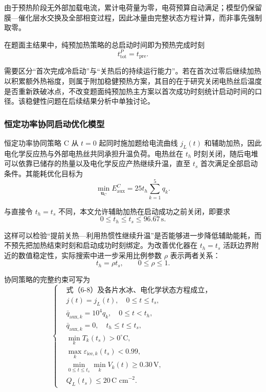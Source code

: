 \documentclass[bwprint]{gmcmthesis}
\numberwithin{figure}{section}
\begin{document}
\noindent 由于预热阶段无外部加载电流，累计电荷量为零，电荷预算自动满足；模型仍保留膜—催化层水交换及全部相变过程，因此冰量由完整状态方程计算，而非事先强制取零。

\noindent 在题面主结果中，纯预加热策略的总启动时间即为预热完成时刻
\begin{equation}
t_{\text{tot}}^P = t_{\text{pre}}. \tag{6-32}
\end{equation}

\noindent 需要区分“首次完成冷启动”与“关热后的持续运行能力”。若在首次过零后继续加热以积累额外热裕度，则属于附加稳健预热方案，其目的在于研究关闭电热丝后温度是否重新跌破冰点，不改变题面纯预加热主方案以首次成功时刻统计启动时间的口径。该稳健性问题在后续结果分析中单独讨论。

\subsubsection{恒定功率协同启动优化模型}

\noindent 恒定功率协同策略 C 从 \(t = 0\) 起同时施加题给电流曲线 \(j_L(t)\) 和辅助加热，因此电化学反应热与外部电热丝共同承担升温负荷。电热丝在 \(t_h\) 时刻关闭，随后电堆可以依靠已储存的热量以及电化学反应产热继续升温，直至 \(t_s\) 首次满足全部启动条件。其能耗优化目标为
\begin{equation}
\min_{\boldsymbol{u}_C} E_{\text{aux}}^C = 25 t_h \sum_{k=1}^5 q_k. \tag{6-33}
\end{equation}

\noindent 与直接令 \(t_h = t_s\) 不同，本文允许辅助加热在启动成功之前关闭，即要求
\begin{equation}
0 \leq t_h \leq t_s \leq 96.67 \, \text{s}. \tag{6-34}
\end{equation}

\noindent 这样可以检验“提前关热—利用热惯性继续升温”是否能够进一步降低辅助能耗，而不预先把加热结束时刻和启动成功时刻绑定。为改善优化器在 \(t_h = t_s\) 活跃边界附近的数值稳定性，实际搜索中进一步采用比例参数 \(\rho\) 表示两者关系：
\begin{equation}
t_h = \rho t_s, \qquad 0 \leq \rho \leq 1. \tag{6-35}
\end{equation}

\noindent 协同策略的完整约束可写为
\begin{equation}
\left\{
\begin{aligned}
& \text{式（6-8）及各片水冰、电化学状态方程成立，} \\
& j(t) = j_L(t), \quad 0 \leq t \leq t_s, \\
& \bar{q}_{\text{aux},k} = 10^4 q_k, \quad 0 \leq t < t_h, \\
& \bar{q}_{\text{aux},k} = 0, \quad t_h \leq t \leq t_s, \\
& \min_k T_k(t_s) > 0^\circ\text{C}, \\
& \max_k \varepsilon_{\text{ice},k}(t_s) < 0.99, \\
& \min_{0 \leq t \leq t_s} \min_k V_k(t) \geq 0.30 \, \text{V}, \\
& Q_L(t_s) \leq 20 \, \text{C cm}^{-2}.
\end{aligned}
\right.
\tag{6-36}
\end{equation}
\end{document}
